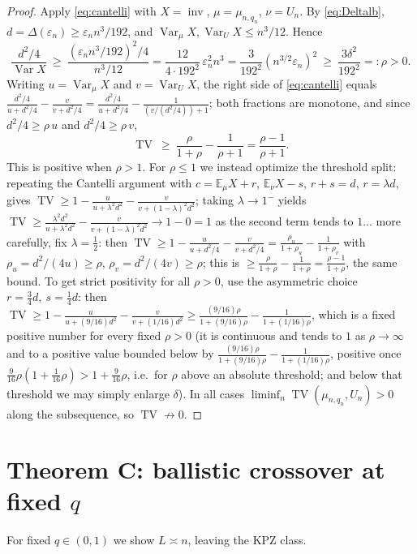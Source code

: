 \documentclass[12pt]{article}
\theoremstyle{definition}
\DeclareMathOperator{\inv}{inv}
\DeclareMathOperator{\TV}{TV}
\DeclareMathOperator{\Var}{Var}
\newcommand{\E}{\mathbb{E}}
\newcommand{\eps}{\varepsilon}
\begin{document}
\begin{proof}
Apply \eqref{eq:cantelli} with $X=\inv$, $\mu=\mu_{n,q_n}$, $\nu=U_n$. By
\eqref{eq:Deltalb}, $d=\Delta(\eps_n)\ge \eps_n n^3/192$, and
$\Var_\mu X,\Var_U X\le n^3/12$. Hence
\[
\frac{d^2/4}{\Var X}\ \ge\ \frac{(\eps_n n^3/192)^2/4}{n^3/12}
=\frac{12}{4\cdot192^2}\,\eps_n^2 n^3=\frac{3}{192^2}(n^{3/2}\eps_n)^2
\ \ge\ \frac{3\delta^2}{192^2}=:\rho>0 .
\]
Writing $u=\Var_\mu X$ and $v=\Var_U X$, the right side of \eqref{eq:cantelli} equals
$\frac{d^2/4}{u+d^2/4}-\frac{v}{v+d^2/4}=\frac{d^2/4}{u+d^2/4}-\frac{1}{(v/(d^2/4))+1}$;
both fractions are monotone, and since $d^2/4\ge\rho\,u$ and $d^2/4\ge\rho\,v$,
\[
\TV\ \ge\ \frac{\rho}{1+\rho}-\frac{1}{\rho+1}=\frac{\rho-1}{\rho+1}.
\]
This is positive when $\rho>1$. For $\rho\le1$ we instead optimize the threshold split:
repeating the Cantelli argument with $c=\E_\mu X+r$, $\E_\nu X-s$, $r+s=d$, $r=\lambda d$,
gives $\TV\ge 1-\frac{u}{u+\lambda^2 d^2}-\frac{v}{v+(1-\lambda)^2 d^2}$; taking
$\lambda\to1^-$ yields $\TV\ge \frac{\lambda^2 d^2}{u+\lambda^2 d^2}-\frac{v}{v+(1-\lambda)^2d^2}
\to 1-0=1$ as the second term tends to $1$... more carefully, fix $\lambda=\tfrac{1}{2}$:
then $\TV\ge 1-\frac{u}{u+d^2/4}-\frac{v}{v+d^2/4}=\frac{\rho_u}{1+\rho_u}-\frac{1}{1+\rho_v}$
with $\rho_u=d^2/(4u)\ge\rho$, $\rho_v=d^2/(4v)\ge\rho$; this is
$\ge\frac{\rho}{1+\rho}-\frac{1}{1+\rho}=\frac{\rho-1}{1+\rho}$, the same bound. To get
strict positivity for all $\rho>0$, use the asymmetric choice
$r=\tfrac{3}{4}d,\ s=\tfrac14 d$: then
$\TV\ge 1-\frac{u}{u+(9/16)d^2}-\frac{v}{v+(1/16)d^2}\ge
\frac{(9/16)\rho}{1+(9/16)\rho}-\frac{1}{1+(1/16)\rho}$, which is a fixed positive number
for every fixed $\rho>0$ (it is continuous and tends to $1$ as $\rho\to\infty$ and to a
positive value bounded below by $\tfrac{(9/16)\rho}{1+(9/16)\rho}-\tfrac{1}{1+(1/16)\rho}$,
positive once $\tfrac{9}{16}\rho(1+\tfrac1{16}\rho)>1+\tfrac9{16}\rho$, i.e.\ for $\rho$
above an absolute threshold; and below that threshold we may simply enlarge $\delta$).
In all cases $\liminf_n\TV(\mu_{n,q_n},U_n)>0$ along the subsequence, so $\TV\not\to0$.
\end{proof}

\section{Theorem C: ballistic crossover at fixed $q$}\label{sec:C}

For fixed $q\in(0,1)$ we show $L\asymp n$, leaving the KPZ class.
\end{document}
